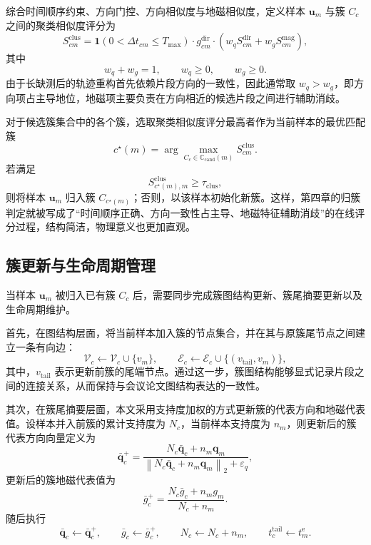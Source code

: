 \documentclass{xdupgthesis}
\begin{document}
综合时间顺序约束、方向门控、方向相似度与地磁相似度，定义样本 $\mathbf{u}_m$ 与簇 $C_c$ 之间的聚类相似度评分为
\begin{equation}
	S_{cm}^{\mathrm{clus}}=
	\mathbf{1}
	\left(
	0<\Delta t_{cm}\le T_{\max}
	\right)
	\cdot
	g_{cm}^{\mathrm{dir}}
	\cdot
	\left(
	w_q S_{cm}^{\mathrm{dir}}+w_g S_{cm}^{\mathrm{mag}}
	\right),
\end{equation}
其中
\begin{equation}
	w_q+w_g=1,\qquad
	w_q\ge 0,\qquad
	w_g\ge 0.
\end{equation}
由于长缺测后的轨迹重构首先依赖片段方向的一致性，因此通常取 $w_q>w_g$，即方向项占主导地位，地磁项主要负责在方向相近的候选片段之间进行辅助消歧。

对于候选簇集合中的各个簇，选取聚类相似度评分最高者作为当前样本的最优匹配簇
\begin{equation}
	c^{\star}(m)=
	\arg\max_{C_c\in\mathbb{C}_{\mathrm{cand}}(m)}S_{cm}^{\mathrm{clus}}.
\end{equation}
若满足
\begin{equation}
	S_{c^{\star}(m),m}^{\mathrm{clus}}\ge \tau_{\mathrm{clus}},
\end{equation}
则将样本 $\mathbf{u}_m$ 归入簇 $C_{c^{\star}(m)}$；否则，以该样本初始化新簇。这样，第四章的归簇判定就被写成了“时间顺序正确、方向一致性占主导、地磁特征辅助消歧”的在线评分过程，结构简洁，物理意义也更加直观。

\subsection{簇更新与生命周期管理}

当样本 $\mathbf{u}_m$ 被归入已有簇 $C_c$ 后，需要同步完成簇图结构更新、簇尾摘要更新以及生命周期维护。

首先，在图结构层面，将当前样本加入簇的节点集合，并在其与原簇尾节点之间建立一条有向边：
\begin{equation}
	\mathcal{V}_c\leftarrow \mathcal{V}_c\cup\{v_m\},\qquad
	\mathcal{E}_c\leftarrow \mathcal{E}_c\cup\{(v_{\mathrm{tail}},v_m)\},
\end{equation}
其中，$v_{\mathrm{tail}}$ 表示更新前簇的尾端节点。通过这一步，簇图结构能够显式记录片段之间的连接关系，从而保持与会议论文图结构表达的一致性。

其次，在簇尾摘要层面，本文采用支持度加权的方式更新簇的代表方向和地磁代表值。设样本并入前簇的累计支持度为 $N_c$，当前样本支持度为 $n_m$，则更新后的簇代表方向向量定义为
\begin{equation}
	\bar{\mathbf{q}}_c^{+}=
	\frac{
		N_c\bar{\mathbf{q}}_c+n_m\mathbf{q}_m
	}{
		\left\|
		N_c\bar{\mathbf{q}}_c+n_m\mathbf{q}_m
		\right\|_2+\varepsilon_q
	},
\end{equation}
更新后的簇地磁代表值为
\begin{equation}
	\bar{g}_c^{+}=
	\frac{N_c\bar{g}_c+n_m g_m}{N_c+n_m}.
\end{equation}
随后执行
\begin{equation}
	\bar{\mathbf{q}}_c\leftarrow \bar{\mathbf{q}}_c^{+},\qquad
	\bar{g}_c\leftarrow \bar{g}_c^{+},\qquad
	N_c\leftarrow N_c+n_m,\qquad
	t_c^{\mathrm{tail}}\leftarrow t_m^{\mathrm{e}}.
\end{equation}
\end{document}
